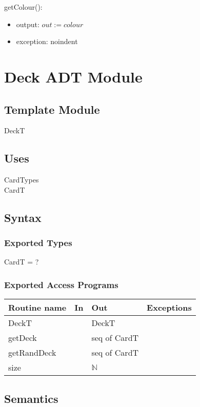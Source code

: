 \documentclass[12pt]{article}
\begin{document}
\noindent getColour():
\begin{itemize}
\item output: $out := colour$
\item exception: noindent
\end{itemize}


\newpage

\section* {Deck ADT Module}

\subsection*{Template Module}

DeckT

\subsection* {Uses}

CardTypes \\
CardT

\subsection* {Syntax}

\subsubsection* {Exported Types}

CardT = ?

\subsubsection* {Exported Access Programs}

\begin{tabular}{| l | l | l | l |}
\hline
\textbf{Routine name} & \textbf{In} & \textbf{Out} & \textbf{Exceptions}\\
\hline
DeckT &  & DeckT &\\
\hline
getDeck & & seq of CardT&\\
\hline
getRandDeck & & seq of CardT&\\
\hline
size & & $\mathbb{N}$&\\
\hline
\end{tabular}

\subsection* {Semantics}
\end{document}
